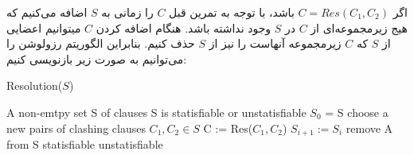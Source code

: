 \documentclass[]{exam}
\begin{document}
اگر $C = Res(C_1, C_2)$ باشد،
با توجه به تمرین قبل $C$ را زمانی به $S$ اضافه می‌کنیم
که هیج زیرمجموعه‌ای از $C$ در $S$ وجود نداشته باشد.
هنگام اضافه کردن $C$ میتوانیم اعضایی از $S$ که $C$ زیرمجموعه آنهاست را نیز
از $S$ حذف کنیم.
بنابراین الگوریتم رزولوشن را می‌توانیم به صورت زیر بازنویسی کنیم:
\begin{latin}
    \begin{algorithm}[H]
        \caption*{Resolution($S$)}
        \begin{algorithmic}
            \Require A non-emtpy set S of clauses
            \Ensure S is statisfiable or unstatisfiable
            \State $S_0$ = S
            \Repeat
            \State choose a new pairs of clashing clauses $C_1, C_2 \in S$
            \State C := Res($C_1, C_2$)
            \State $S_{i+1} := S_i$
            \State remove A from S
            \EndWhile
            \EndIf
            \State \Return statisfiable
            \Else
            \State \Return unstatisfiable
            \EndIf
        \end{algorithmic}
    \end{algorithm}
\end{latin}
\end{document}

